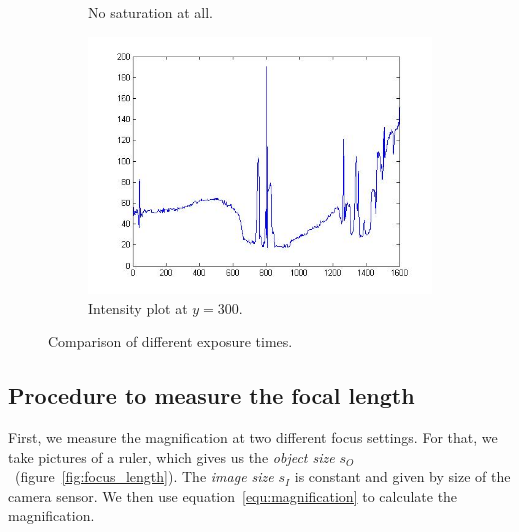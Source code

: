 \documentclass[a4paper, 12pt]{paper}
\begin{document}
\begin{figure}[h]
\begin{subfigure}[p]{0.40\textwidth}
        \caption{No saturation at all.}
\label{fig:no_sat}
    \end{subfigure}
    \begin{subfigure}[p]{0.40\textwidth}
        \includegraphics[width=\textwidth]{img/no_sat_int}
        \caption{Intensity plot at $y=300$.}
    \end{subfigure}
    \caption{Comparison of different exposure times.}
\label{fig:saturation}
\end{figure}


\subsection{Procedure to measure the focal length}

First, we measure the magnification at two different focus settings.
For that, we take pictures of a ruler, which gives us the \emph{object size} $s_O$~(figure~\ref{fig:focus_length}).
The \emph{image size} $s_I$ is constant and given by size of the camera sensor.
We then use equation~\ref{equ:magnification} to calculate the magnification.
\end{document}
